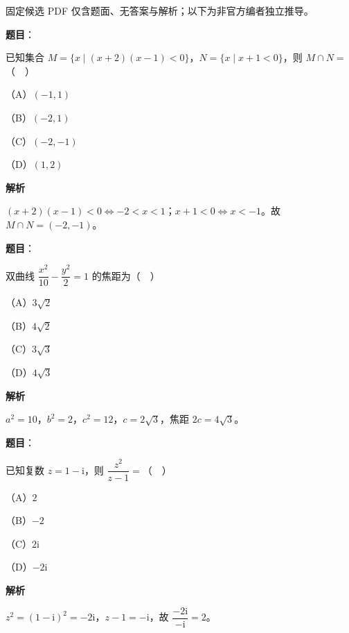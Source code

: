 

\begin{gktip}
固定候选 PDF 仅含题面、无答案与解析；以下为非官方编者独立推导。
\end{gktip}

\begin{answer}

\textbf{题目}：

已知集合 $M=\{x\mid(x+2)(x-1)<0\}$，$N=\{x\mid x+1<0\}$，则 $M\cap N=$（　）

（A）$(-1,1)$

（B）$(-2,1)$

（C）$(-2,-1)$

（D）$(1,2)$

\textbf{解析}

$(x+2)(x-1)<0\iff-2<x<1$；$x+1<0\iff x<-1$。故 $M\cap N=(-2,-1)$。


\end{answer}
\begin{answer}

\textbf{题目}：

双曲线 $\dfrac{x^2}{10}-\dfrac{y^2}{2}=1$ 的焦距为（　）

（A）$3\sqrt2$

（B）$4\sqrt2$

（C）$3\sqrt3$

（D）$4\sqrt3$

\textbf{解析}

$a^2=10$，$b^2=2$，$c^2=12$，$c=2\sqrt3$，焦距 $2c=4\sqrt3$。


\end{answer}
\begin{answer}

\textbf{题目}：

已知复数 $z=1-\mathrm i$，则 $\dfrac{z^2}{z-1}=$（　）

（A）$2$

（B）$-2$

（C）$2\mathrm i$

（D）$-2\mathrm i$

\textbf{解析}

$z^2=(1-\mathrm i)^2=-2\mathrm i$，$z-1=-\mathrm i$，故 $\dfrac{-2\mathrm i}{-\mathrm i}=2$。


\end{answer}
